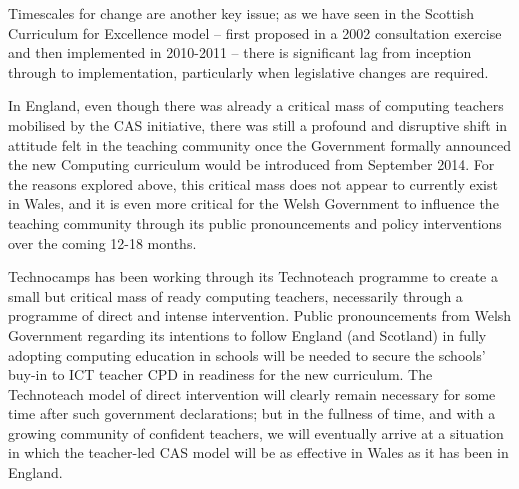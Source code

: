 \documentclass{sig-alternate}
\begin{document}
Timescales for change are another key issue; as we have seen in the
Scottish Curriculum for Excellence model -- first proposed in a 2002
consultation exercise and then implemented in 2010-2011 -- there is
significant lag from inception through to implementation, particularly
when legislative changes are required.

In England, even though there was already a critical mass of computing
teachers mobilised by the CAS initiative, there was still a profound
and disruptive shift in attitude felt in the teaching community once
the Government formally announced the new Computing curriculum would
be introduced from September 2014.  For the reasons explored above,
this critical mass does not appear to currently exist in Wales, and it
is even more critical for the Welsh Government to influence the
teaching community through its public pronouncements and policy
interventions over the coming 12-18 months.

Technocamps has been working through its Technoteach programme to
create a small but critical mass of ready computing teachers,
necessarily through a programme of direct and intense intervention.
Public pronouncements from Welsh Government regarding its intentions
to follow England (and Scotland) in fully adopting computing education
in schools will be needed to secure the schools' buy-in to ICT teacher
CPD in readiness for the new curriculum.  The Technoteach model of
direct intervention will clearly remain necessary for some time after
such government declarations; but in the fullness of time, and with a
growing community of confident teachers, we will eventually arrive at
a situation in which the teacher-led CAS model will be as effective in
Wales as it has been in England.






\end{document}
